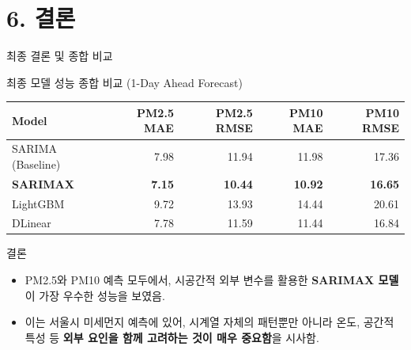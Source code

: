 \documentclass[serif, aspectratio=169]{beamer}
\begin{document}
\section{6. 결론}
\begin{frame}{최종 결론 및 종합 비교}
    \begin{block}{\small 최종 모델 성능 종합 비교 (1-Day Ahead Forecast)}
        \begin{center}
        \scriptsize
        \begin{tabular}{lrrrr}
        \toprule
        \textbf{Model} & \textbf{PM2.5 MAE} & \textbf{PM2.5 RMSE} & \textbf{PM10 MAE} & \textbf{PM10 RMSE} \\
        \midrule
        SARIMA (Baseline) & 7.98 & 11.94 & 11.98 & 17.36 \\
        \textbf{SARIMAX} & \textbf{7.15} & \textbf{10.44} & \textbf{10.92} & \textbf{16.65} \\
        LightGBM & 9.72 & 13.93 & 14.44 & 20.61 \\
        DLinear & 7.78 & 11.59 & 11.44 & 16.84 \\
        \bottomrule
        \end{tabular}
        \end{center}
    \end{block}
    
    \begin{block}{결론}
        \begin{itemize}
            \item \scriptsize PM2.5와 PM10 예측 모두에서, 시공간적 외부 변수를 활용한 \textbf{SARIMAX 모델}이 가장 우수한 성능을 보였음.
            \item \scriptsize 이는 서울시 미세먼지 예측에 있어, 시계열 자체의 패턴뿐만 아니라 온도, 공간적 특성 등 \textbf{외부 요인을 함께 고려하는 것이 매우 중요함}을 시사함.

        \end{itemize}
    \end{block}

\end{frame}
\end{document}
